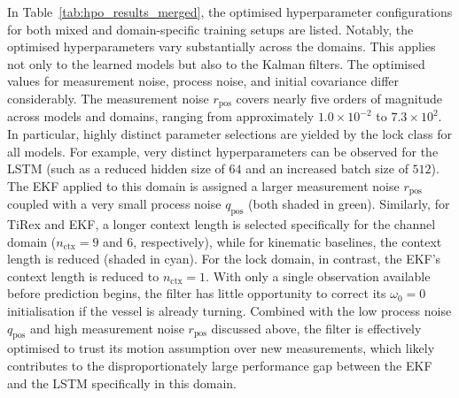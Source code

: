 In Table~\ref{tab:hpo_results_merged}, the optimised hyperparameter configurations for both mixed and domain-specific training setups are listed.
Notably, the optimised hyperparameters vary substantially across the domains.
This applies not only to the learned models but also to the Kalman filters. The optimised values for measurement noise, process noise, and initial covariance differ considerably. 
The measurement noise $r_\text{pos}$ covers nearly five orders of magnitude across models and domains, ranging from approximately $1.0\times10^{-2}$ to $7.3\times10^{2}$.
In particular, highly distinct parameter selections are yielded by the lock class for all models.
For example, very distinct hyperparameters can be observed for the \ac{LSTM} (such as a reduced hidden size of $64$ and an increased batch size of $512$). The \ac{EKF} applied to this domain is assigned a larger measurement noise $r_\text{pos}$ coupled with a very small process noise $q_\text{pos}$ (both shaded in green). 
Similarly, for TiRex and \ac{EKF}, a longer context length is selected specifically for the channel domain ($n_\text{ctx} = 9$ and $6$, respectively), while for kinematic baselines, the context length is reduced (shaded in cyan). %
For the lock domain, in contrast, the \ac{EKF}'s context length is reduced to $n_\text{ctx}=1$. With only a single observation available before prediction begins, the filter has little opportunity to correct its $\omega_0=0$ initialisation if the vessel is already turning. Combined with the low process noise $q_\text{pos}$ and high measurement noise $r_\text{pos}$ discussed above, the filter is effectively optimised to trust its motion assumption over new measurements, which likely contributes to the disproportionately large performance gap between the \ac{EKF} and the \ac{LSTM} specifically in this domain.

